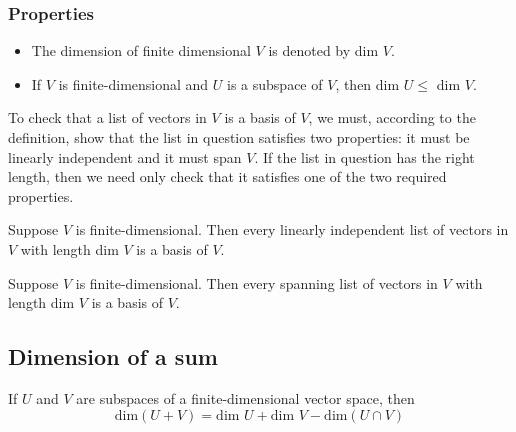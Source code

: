 \subsubsection{Properties}
\begin{itemize}
  \item The dimension of finite dimensional $V$ is denoted by dim $V$.
  \item If $V$ is finite-dimensional and $U$ is a subspace of $V$, then dim $U \le$ dim $V$.
\end{itemize}

To check that a list of vectors in $V$ is a basis of $V$, we must, according to the definition, show that the list in question satisfies two properties: it must be linearly independent and it must span $V$. If the list in question has the right length, then we need only check that it satisfies one of the two required properties.

\begin{theorem}
  Suppose $V$ is finite-dimensional. Then every linearly independent list of vectors in $V$ with length dim $V$ is a basis of $V$.
\end{theorem}

\begin{theorem}
  Suppose $V$ is finite-dimensional. Then every spanning list of vectors in $V$ with length dim $V$ is a basis of $V$.
\end{theorem}

\subsection{Dimension of a sum}
If $U$ and $V$ are subspaces of a finite-dimensional vector space, then
\[
  \text{dim}(U+V) = \text{dim } U + \text{dim } V - \text{dim} (U \cap V)
\]
